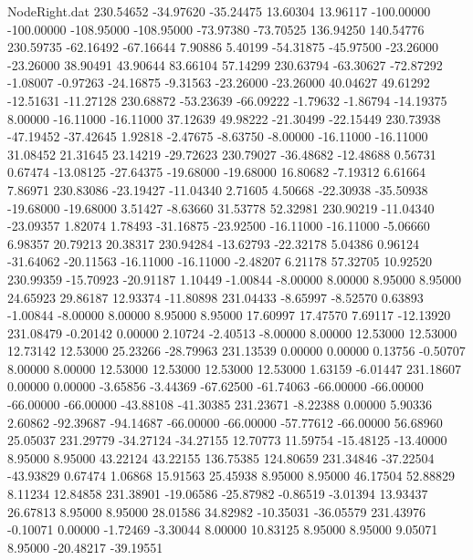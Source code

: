 \begin{filecontents}{NodeRight.dat}
 230.54652  -34.97620  -35.24475    13.60304   13.96117 -100.00000 -100.00000 -108.95000 -108.95000  -73.97380  -73.70525  136.94250  140.54776
 230.59735  -62.16492  -67.16644     7.90886    5.40199  -54.31875  -45.97500  -23.26000  -23.26000   38.90491   43.90644   83.66104   57.14299
 230.63794  -63.30627  -72.87292    -1.08007   -0.97263  -24.16875   -9.31563  -23.26000  -23.26000   40.04627   49.61292  -12.51631  -11.27128
 230.68872  -53.23639  -66.09222    -1.79632   -1.86794  -14.19375    8.00000  -16.11000  -16.11000   37.12639   49.98222  -21.30499  -22.15449
 230.73938  -47.19452  -37.42645     1.92818   -2.47675   -8.63750   -8.00000  -16.11000  -16.11000   31.08452   21.31645   23.14219  -29.72623
 230.79027  -36.48682  -12.48688     0.56731    0.67474  -13.08125  -27.64375  -19.68000  -19.68000   16.80682   -7.19312    6.61664    7.86971
 230.83086  -23.19427  -11.04340     2.71605    4.50668  -22.30938  -35.50938  -19.68000  -19.68000    3.51427   -8.63660   31.53778   52.32981
 230.90219  -11.04340  -23.09357     1.82074    1.78493  -31.16875  -23.92500  -16.11000  -16.11000   -5.06660    6.98357   20.79213   20.38317
 230.94284  -13.62793  -22.32178     5.04386    0.96124  -31.64062  -20.11563  -16.11000  -16.11000   -2.48207    6.21178   57.32705   10.92520
 230.99359  -15.70923  -20.91187     1.10449   -1.00844   -8.00000    8.00000    8.95000    8.95000   24.65923   29.86187   12.93374  -11.80898
 231.04433   -8.65997   -8.52570     0.63893   -1.00844   -8.00000    8.00000    8.95000    8.95000   17.60997   17.47570    7.69117  -12.13920
 231.08479   -0.20142    0.00000     2.10724   -2.40513   -8.00000    8.00000   12.53000   12.53000   12.73142   12.53000   25.23266  -28.79963
 231.13539    0.00000    0.00000     0.13756   -0.50707    8.00000    8.00000   12.53000   12.53000   12.53000   12.53000    1.63159   -6.01447
 231.18607    0.00000    0.00000    -3.65856   -3.44369  -67.62500  -61.74063  -66.00000  -66.00000  -66.00000  -66.00000  -43.88108  -41.30385
 231.23671   -8.22388    0.00000     5.90336    2.60862  -92.39687  -94.14687  -66.00000  -66.00000  -57.77612  -66.00000   56.68960   25.05037
 231.29779  -34.27124  -34.27155    12.70773   11.59754  -15.48125  -13.40000    8.95000    8.95000   43.22124   43.22155  136.75385  124.80659
 231.34846  -37.22504  -43.93829     0.67474    1.06868   15.91563   25.45938    8.95000    8.95000   46.17504   52.88829    8.11234   12.84858
 231.38901  -19.06586  -25.87982    -0.86519   -3.01394   13.93437   26.67813    8.95000    8.95000   28.01586   34.82982  -10.35031  -36.05579
 231.43976   -0.10071    0.00000    -1.72469   -3.30044    8.00000   10.83125    8.95000    8.95000    9.05071    8.95000  -20.48217  -39.19551

\end{filecontents}
